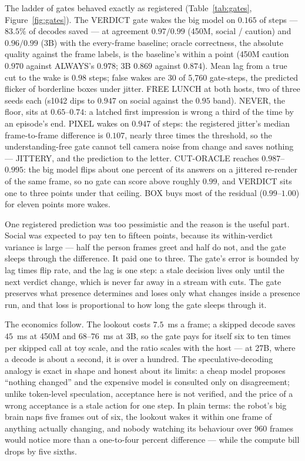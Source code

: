 \documentclass[11pt]{article}
\begin{document}
The ladder of gates behaved exactly as registered (Table~\ref{tab:gates},
Figure~\ref{fig:gates}). The VERDICT gate wakes the big model on
$0.165$ of steps --- $83.5\%$ of decodes saved --- at agreement $0.97 /
0.99$ (450M, social / caution) and $0.96 / 0.99$ (3B) with the
every-frame baseline; oracle correctness, the absolute quality against
the frame labels, is the baseline's within a point (450M caution $0.970$
against ALWAYS's $0.978$; 3B $0.869$ against $0.874$). Mean lag from a
true cut to the wake is $0.98$ steps; false wakes are 30 of 5,760
gate-steps, the predicted flicker of borderline boxes under jitter.
FREE LUNCH at both hosts, two of three seeds each (s1042 dips to
$0.947$ on social against the $0.95$ band). NEVER, the floor, sits at
$0.65$--$0.74$: a latched first impression is wrong a third of the time
by an episode's end. PIXEL wakes on $0.947$ of steps: the registered
jitter's median frame-to-frame difference is $0.107$, nearly three
times the threshold, so the understanding-free gate cannot tell camera
noise from change and saves nothing --- JITTERY, and the prediction to
the letter. CUT-ORACLE reaches $0.987$--$0.995$: the big model flips
about one percent of its answers on a jittered re-render of the same
frame, so no gate can score above roughly $0.99$, and VERDICT sits one
to three points under that ceiling. BOX buys most of the residual
($0.99$--$1.00$) for eleven points more wakes.

One registered prediction was too pessimistic and the reason is the
useful part. Social was expected to pay ten to fifteen points, because
its within-verdict variance is large --- half the person frames greet
and half do not, and the gate sleeps through the difference. It paid
one to three. The gate's error is bounded by lag times flip rate, and
the lag is one step: a stale decision lives only until the next
verdict change, which is never far away in a stream with cuts. The gate
preserves what presence determines and loses only what changes inside
a presence run, and that loss is proportional to how long the gate
sleeps through it.

The economics follow. The lookout costs $7.5$~ms a frame; a skipped
decode saves $45$~ms at 450M and $68$--$76$~ms at 3B, so the gate pays
for itself six to ten times per skipped call at toy scale, and the
ratio scales with the host --- at 27B, where a decode is about a second,
it is over a hundred. The speculative-decoding analogy is exact in
shape and honest about its limits: a cheap model proposes ``nothing
changed'' and the expensive model is consulted only on disagreement;
unlike token-level speculation, acceptance here is not verified, and
the price of a wrong acceptance is a stale action for one step. In
plain terms: the robot's big brain naps five frames out of six, the
lookout wakes it within one frame of anything actually changing, and
nobody watching its behaviour over 960 frames would notice more than a
one-to-four percent difference --- while the compute bill drops by five
sixths.
\end{document}
